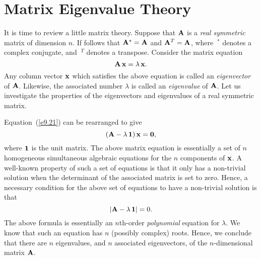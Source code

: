 \section{Matrix Eigenvalue Theory}\label{smatrix}
It is time to review a little matrix theory. Suppose that ${\bf A}$ is
a {\em real symmetric}\/ matrix of dimension $n$. If follows that
${\bf A}^\ast = {\bf A}$ and ${\bf A}^T = {\bf A}$, where $~^\ast$
denotes a complex conjugate, and $~^T$ denotes a transpose.
Consider the matrix equation
\begin{equation}\label{e9.21}
{\bf A} \,{\bf x} = \lambda\,{\bf x}.
\end{equation}
Any column vector ${\bf x}$ which satisfies the above equation is called
an {\em eigenvector}\/ of ${\bf A}$. Likewise, the associated number $\lambda$ is called an {\em eigenvalue}\/ of ${\bf A}$. Let us investigate the properties of the eigenvectors and eigenvalues of a real
symmetric matrix.

Equation~(\ref{e9.21}) can be rearranged to give
\begin{equation}
({\bf A} - \lambda\,{\bf 1})\,{\bf x} = {\bf 0},
\end{equation}
where ${\bf 1}$ is the unit matrix. The above matrix equation is essentially a set of $n$ homogeneous
simultaneous algebraic equations for the $n$ components of ${\bf x}$. 
A well-known property of such a set of equations is that it only has a non-trivial
solution when the determinant of the associated matrix is set to zero. 
Hence, a necessary condition for the above set of equations to have a non-trivial
solution is that
\begin{equation}
|{\bf A} - \lambda\,{\bf 1}| = 0.
\end{equation}
The above formula is essentially an $n$th-order {\em polynomial}\/ equation
for $\lambda$. We know that such an equation has $n$ (possibly complex)
roots. Hence, we conclude that there are $n$ eigenvalues, and $n$ associated eigenvectors, of the $n$-dimensional matrix ${\bf A}$. 

